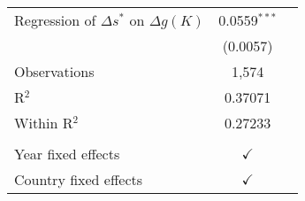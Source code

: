\centering
\begin{tabularx}{\columnwidth}{lcc}
   Regression of $\Delta s^*$ on $\Delta g(K)$   & 0.0559$^{***}$\\   
                                                 & (0.0057)\\   
   Observations                                  & 1,574\\  
   R$^2$                                         & 0.37071\\  
   Within R$^2$                                  & 0.27233\\  
    \\
   Year fixed effects                            & $\checkmark$\\   
   Country fixed effects                         & $\checkmark$\\   
\end{tabularx}
   \label{tbl-wid_si_table}
